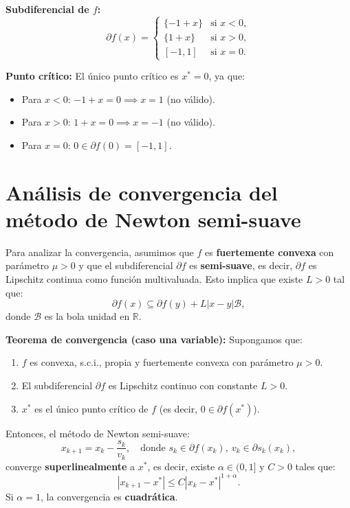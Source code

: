 \documentclass[12pt]{book}
\theoremstyle{definition}
\theoremstyle{plain}
\theoremstyle{remark}
\begin{document}
\medskip
\textbf{Subdiferencial de \( f \):}
\[
\partial f(x) =
\begin{cases}
\{-1 + x\} & \text{si } x < 0, \\
\{1 + x\} & \text{si } x > 0, \\
[-1, 1] & \text{si } x = 0.
\end{cases}
\]

\medskip
\textbf{Punto crítico:}
El único punto crítico es \( x^* = 0 \), ya que:
\begin{itemize}
    \item Para \( x < 0 \): \( -1 + x = 0 \implies x = 1 \) (no válido).
    \item Para \( x > 0 \): \( 1 + x = 0 \implies x = -1 \) (no válido).
    \item Para \( x = 0 \): \( 0 \in \partial f(0) = [-1, 1] \).
\end{itemize}

\section*{Análisis de convergencia del método de Newton semi-suave}

Para analizar la convergencia, asumimos que \( f \) es \textbf{fuertemente convexa} con parámetro \( \mu > 0 \) y que el subdiferencial \( \partial f \) es \textbf{semi-suave}, es decir, \( \partial f \) es Lipschitz continua como función multivaluada. Esto implica que existe \( L > 0 \) tal que:
\[
\partial f(x) \subseteq \partial f(y) + L |x - y| \mathcal{B},
\]
donde \( \mathcal{B} \) es la bola unidad en \( \mathbb{R} \).

\medskip
\textbf{Teorema de convergencia (caso una variable):}
Supongamos que:
\begin{enumerate}
    \item \( f \) es convexa, s.c.i., propia y fuertemente convexa con parámetro \( \mu > 0 \).
    \item El subdiferencial \( \partial f \) es Lipschitz continuo con constante \( L > 0 \).
    \item \( x^* \) es el único punto crítico de \( f \) (es decir, \( 0 \in \partial f(x^*) \)).
\end{enumerate}
Entonces, el método de Newton semi-suave:
\[
x_{k+1} = x_k - \frac{s_k}{v_k}, \quad \text{donde } s_k \in \partial f(x_k), \ v_k \in \partial s_k(x_k),
\]
converge \textbf{superlinealmente} a \( x^* \), es decir, existe \( \alpha \in (0,1] \) y \( C > 0 \) tales que:
\[
|x_{k+1} - x^*| \leq C |x_k - x^*|^{1 + \alpha}.
\]
Si \( \alpha = 1 \), la convergencia es \textbf{cuadrática}.
\end{document}
